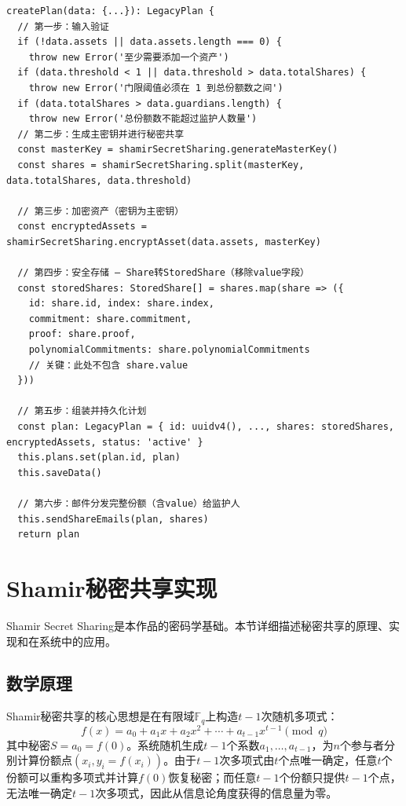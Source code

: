 \documentclass[UTF8,a4paper,zihao=-4,openany]{ctexrep}
\begin{document}
\begin{lstlisting}[caption={createPlan核心实现 (legacyPlanService.ts:118-210, 节选)}]
createPlan(data: {...}): LegacyPlan {
  // 第一步：输入验证
  if (!data.assets || data.assets.length === 0) {
    throw new Error('至少需要添加一个资产')
  if (data.threshold < 1 || data.threshold > data.totalShares) {
    throw new Error('门限阈值必须在 1 到总份额数之间')
  if (data.totalShares > data.guardians.length) {
    throw new Error('总份额数不能超过监护人数量')
  // 第二步：生成主密钥并进行秘密共享
  const masterKey = shamirSecretSharing.generateMasterKey()
  const shares = shamirSecretSharing.split(masterKey, data.totalShares, data.threshold)

  // 第三步：加密资产（密钥为主密钥）
  const encryptedAssets = shamirSecretSharing.encryptAsset(data.assets, masterKey)

  // 第四步：安全存储 — Share转StoredShare（移除value字段）
  const storedShares: StoredShare[] = shares.map(share => ({
    id: share.id, index: share.index,
    commitment: share.commitment,
    proof: share.proof,
    polynomialCommitments: share.polynomialCommitments
    // 关键：此处不包含 share.value
  }))

  // 第五步：组装并持久化计划
  const plan: LegacyPlan = { id: uuidv4(), ..., shares: storedShares, encryptedAssets, status: 'active' }
  this.plans.set(plan.id, plan)
  this.saveData()

  // 第六步：邮件分发完整份额（含value）给监护人
  this.sendShareEmails(plan, shares)
  return plan
\end{lstlisting}

\section{Shamir秘密共享实现}

Shamir Secret Sharing是本作品的密码学基础。本节详细描述秘密共享的原理、实现和在系统中的应用。

\subsection{数学原理}

Shamir秘密共享的核心思想是在有限域$\mathbb{F}_q$上构造$t-1$次随机多项式：
\[
f(x)=a_0+a_1x+a_2x^2+\cdots+a_{t-1}x^{t-1}\pmod{q}
\]
其中秘密$S=a_0=f(0)$。系统随机生成$t-1$个系数$a_1,\dots,a_{t-1}$，为$n$个参与者分别计算份额点$(x_i, y_i=f(x_i))$。由于$t-1$次多项式由$t$个点唯一确定，任意$t$个份额可以重构多项式并计算$f(0)$恢复秘密；而任意$t-1$个份额只提供$t-1$个点，无法唯一确定$t-1$次多项式，因此从信息论角度获得的信息量为零。
\end{document}
